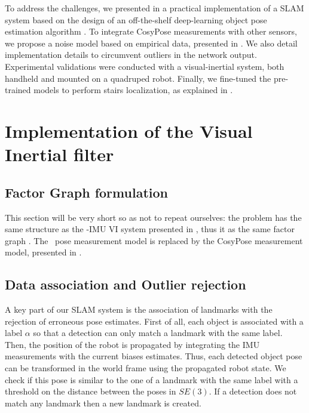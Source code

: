 To address the challenges, we presented in \cite{debeunne2021cosyslam} a practical implementation of a SLAM system based on the design of an off-the-shelf 
deep-learning object pose estimation algorithm \cite{labbe2020cosypose}. To integrate CosyPose measurements with other sensors, we propose a noise model based 
on empirical data, presented in . We also detail implementation details to circumvent outliers in the network output. 
Experimental validations were conducted with a visual-inertial system, both handheld and mounted on a quadruped robot. Finally, we fine-tuned the pre-trained models 
to perform stairs localization, as explained in . 




\section{Implementation of the Visual Inertial filter}

\subsection{Factor Graph formulation}
This section will be very short so as not to repeat ourselves: the problem has the same structure as the \apriltag-IMU VI system presented in , 
thus it as the same factor graph . The \apriltag\ pose measurement model is replaced by the CosyPose measurement model, presented in .


\subsection{Data association and Outlier rejection}
A key part of our SLAM system is the association of landmarks with the rejection of erroneous pose estimates. First of all, each object is associated with a 
label $\alpha$ so that a detection can only match a landmark with the same label. Then, the position of the robot is propagated by integrating the IMU measurements 
with the current biases estimates. Thus, each detected object pose can be transformed in the world frame using the propagated robot state. We check if this pose is 
similar to the one of a landmark with the same label with a threshold on the distance between the poses in $SE(3)$. 
If a detection does not match any landmark then a new landmark is created.

